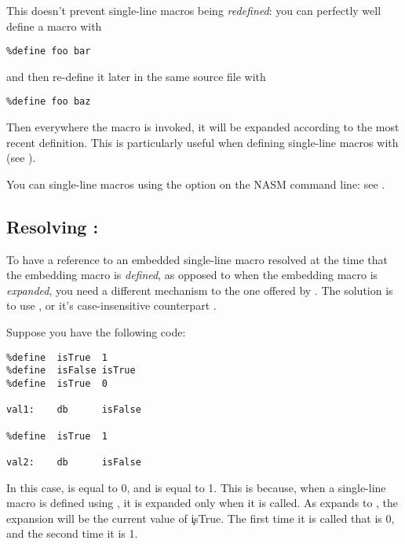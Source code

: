 This doesn't prevent single-line macros being \emph{redefined}:
you can perfectly well define a macro with

\begin{lstlisting}
%define foo bar
\end{lstlisting}

and then re-define it later in the same source file with

\begin{lstlisting}
%define foo baz
\end{lstlisting}

Then everywhere the macro  is invoked, it will be expanded
according to the most recent definition. This is particularly useful
when defining single-line macros with 
(see ).

You can  single-line macros using the 
option on the NASM command line: see .

\subsection{Resolving : }
\label{subsec:xdefine}

To have a reference to an embedded single-line macro resolved at the
time that the embedding macro is \emph{defined}, as opposed to when the
embedding macro is \emph{expanded}, you need a different mechanism to the
one offered by . The solution is to use , or
it's case-insensitive counterpart .

Suppose you have the following code:

\begin{lstlisting}
%define  isTrue  1
%define  isFalse isTrue
%define  isTrue  0

val1:    db      isFalse

%define  isTrue  1

val2:    db      isFalse
\end{lstlisting}

In this case,  is equal to 0, and  is equal to 1.
This is because, when a single-line macro is defined using ,
it is expanded only when it is called. As  expands to ,
the expansion will be the current value of \c{isTrue}. The first time it is called
that is 0, and the second time it is 1.

